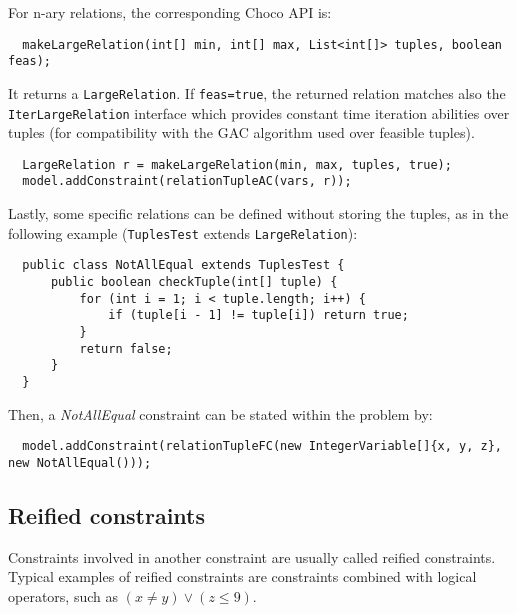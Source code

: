 For n-ary relations, the corresponding Choco API is:
\begin{lstlisting}
  makeLargeRelation(int[] min, int[] max, List<int[]> tuples, boolean feas);
\end{lstlisting}
It returns a \texttt{LargeRelation}. If \texttt{feas=true}, the returned relation matches also the \texttt{IterLargeRelation} interface which provides constant time iteration abilities over tuples (for compatibility with the GAC algorithm used over feasible tuples).
\begin{lstlisting}
  LargeRelation r = makeLargeRelation(min, max, tuples, true);
  model.addConstraint(relationTupleAC(vars, r));
\end{lstlisting}

Lastly, some specific relations can be defined without storing the tuples, as in the following example (\texttt{TuplesTest} extends \texttt{LargeRelation}):
\begin{lstlisting}
  public class NotAllEqual extends TuplesTest {
      public boolean checkTuple(int[] tuple) {
          for (int i = 1; i < tuple.length; i++) {
              if (tuple[i - 1] != tuple[i]) return true;
          }
          return false;
      }
  }
\end{lstlisting}
Then, a \emph{NotAllEqual} constraint can be stated within the problem by:
\begin{lstlisting}
  model.addConstraint(relationTupleFC(new IntegerVariable[]{x, y, z}, new NotAllEqual()));
\end{lstlisting}




\subsection{Reified constraints}\label{model:reifiedconstraints}\hypertarget{model:reifiedconstraints}{}
Constraints involved in another constraint are usually called reified constraints. Typical examples of reified constraints are
 constraints combined with logical operators, such as $(x \neq y) \lor (z \le 9)$.

